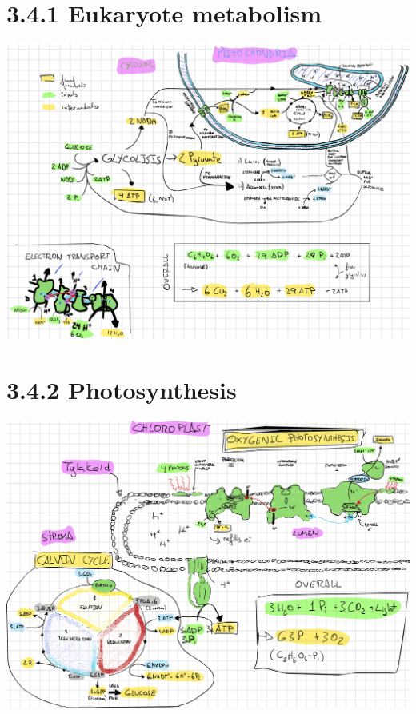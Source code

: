 \documentclass[a4paper,landscape,10pt]{cheatsheet}
\begin{document}
\section*{3.4.1 Eukaryote metabolism}
\begin{minipage}[H]{600px}
\includegraphics*[width=600px]{images/eukaryote_metabolism.png}
\end{minipage}

\pagebreak
\begin{minipage}[posx=0,posy=0]{600px}
\section*{3.4.2 Photosynthesis}
\includegraphics*[width=700px]{images/oxygenic_photosynthesis.png}
\end{minipage}
\end{document}
